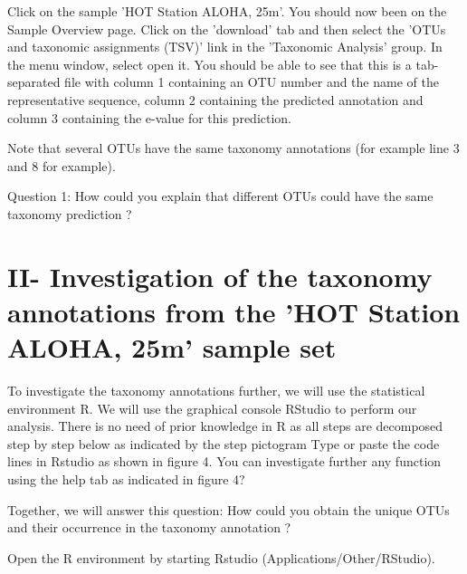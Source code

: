 \documentclass[a4paper,12pt,twoside]{memoir}
\begin{document}
\begin{steps}
Click on the sample 'HOT Station ALOHA, 25m'. You should now been on the Sample Overview page. Click on the 'download' tab and then select the 'OTUs and taxonomic assignments (TSV)' link in the 'Taxonomic Analysis' group. In the menu window, select open it. You should be able to see that this is a tab-separated file with column 1 containing an OTU number and the name of the representative sequence, column 2 containing the predicted annotation and column 3 containing the e-value for this prediction.
\end{steps}

\begin{note}
Note that several OTUs have the same taxonomy annotations (for example line 3 and 8 for example).
\end{note}

\begin{questions}
Question 1: How could you explain that different OTUs could have the same taxonomy prediction ?


\end{questions}

\section{II- Investigation of the taxonomy annotations from the 'HOT Station ALOHA, 25m' sample set}

\begin{information}
To investigate the taxonomy annotations further, we will use the statistical environment R. We will use the graphical console RStudio to perform our analysis. There is no need of prior knowledge in R as all steps are decomposed step by step below as indicated by the step pictogram 
Type or paste the code lines in Rstudio as shown in figure 4. You can investigate further any function using the help tab as indicated in figure 4?
\end{information}

\begin{questions}
Together, we will answer this question: How could you obtain the unique OTUs and their occurrence in the taxonomy annotation ?


\end{questions}

\begin{steps}
Open the R environment by starting Rstudio (Applications/Other/RStudio). 
\end{steps}
\end{document}
